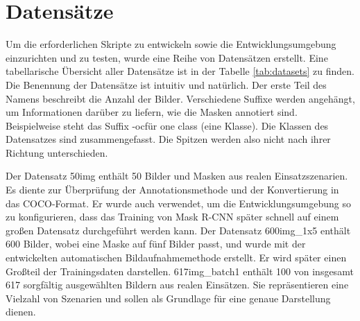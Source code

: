 \section{Datensätze}
Um die erforderlichen Skripte zu entwickeln sowie die Entwicklungsumgebung einzurichten und zu testen, wurde eine Reihe von Datensätzen erstellt. Eine tabellarische Übersicht aller Datensätze ist in der Tabelle \ref{tab:datasets} zu finden.
Die Benennung der Datensätze ist intuitiv und natürlich. Der erste Teil des Namens beschreibt die Anzahl der Bilder. Verschiedene Suffixe werden angehängt, um Informationen darüber zu liefern, wie die Masken annotiert sind. Beispielweise steht das Suffix \glqq -oc\grqq{}für \glqq one class\grqq{} (eine Klasse). Die Klassen des Datensatzes sind zusammengefasst. Die Spitzen werden also nicht nach ihrer Richtung unterschieden.

Der Datensatz \glqq 50img\grqq{} enthält 50 Bilder und Masken aus realen Einsatzszenarien. Es diente zur Überprüfung der Annotationsmethode und der Konvertierung in das COCO-Format. Er wurde auch verwendet, um die Entwicklungsumgebung so zu konfigurieren, dass das Training von Mask R-CNN später schnell auf einem großen Datensatz durchgeführt werden kann. 
Der Datensatz \glqq 600img\_1x5\grqq{} enthält 600 Bilder, wobei eine Maske auf fünf Bilder passt, und wurde mit der entwickelten automatischen Bildaufnahmemethode erstellt. Er wird später einen Großteil der Trainingsdaten darstellen.
\glqq 617img\_batch1\grqq{} enthält 100 von insgesamt 617 sorgfältig ausgewählten Bildern aus realen Einsätzen. Sie repräsentieren eine Vielzahl von Szenarien und sollen als Grundlage für eine genaue Darstellung dienen.

